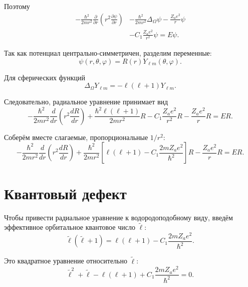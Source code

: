 \documentclass[../final.tex]{subfiles}
\begin{document}
Поэтому
\begin{align*}
    -\frac{\hbar^2}{2mr^2}
    \frac{\partial}{\partial r}
    \left(
        r^2\frac{\partial\psi}{\partial r}
    \right)
    &-
    \frac{\hbar^2}{2mr^2}
    \Delta_\Omega\psi
    -
    \frac{Z_a e^2}{r}\psi
    \\
    &-
    C_1\frac{Z_a e^2}{r^2}\psi
    =
    E\psi.
\end{align*}

Так как потенциал центрально-симметричен, разделим переменные:
\begin{equation*}
    \psi(r,\theta,\varphi)
    =
    R(r)Y_{\ell m}(\theta,\varphi).
\end{equation*}

Для сферических функций
\begin{equation*}
    \Delta_\Omega Y_{\ell m}
    =
    -\ell(\ell+1)Y_{\ell m}.
\end{equation*}

Следовательно, радиальное уравнение принимает вид
\begin{equation*}
    -\frac{\hbar^2}{2mr^2}
    \frac{d}{dr}
    \left(
        r^2\frac{dR}{dr}
    \right)
    +
    \frac{\hbar^2\ell(\ell+1)}{2mr^2}R
    -
    C_1\frac{Z_a e^2}{r^2}R
    -
    \frac{Z_a e^2}{r}R
    =
    ER.
\end{equation*}

Соберём вместе слагаемые, пропорциональные \(1/r^2\):
\begin{equation*}
    -\frac{\hbar^2}{2mr^2}
    \frac{d}{dr}
    \left(
        r^2\frac{dR}{dr}
    \right)
    +
    \frac{\hbar^2}{2mr^2}
    \left[
        \ell(\ell+1)
        -
        C_1\frac{2mZ_a e^2}{\hbar^2}
    \right]R-
    \frac{Z_a e^2}{r}R
    =
    ER.
\end{equation*}

\section{Квантовый дефект}

Чтобы привести радиальное уравнение к водородоподобному виду,
введём эффективное орбитальное квантовое число \(\tilde\ell\):
\begin{equation*}
    \boxed{
        \tilde\ell(\tilde\ell+1)
        =
        \ell(\ell+1)
        -
        C_1\frac{2mZ_a e^2}{\hbar^2}
    }.
\end{equation*}

Это квадратное уравнение относительно \(\tilde\ell\):
\begin{equation*}
    \tilde\ell^2+\tilde\ell
    -
    \ell(\ell+1)
    +
    C_1\frac{2mZ_a e^2}{\hbar^2}
    =
    0.
\end{equation*}
\end{document}
